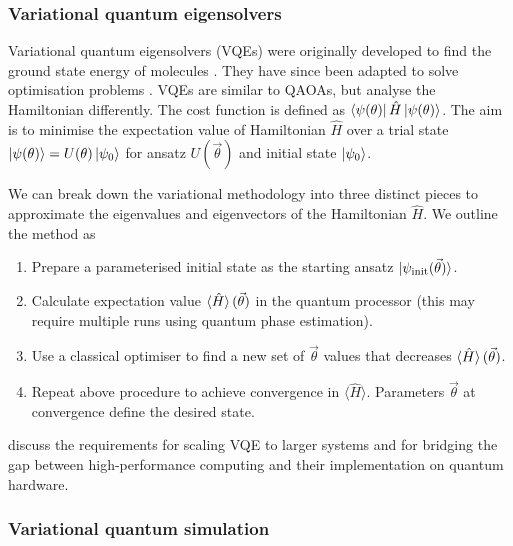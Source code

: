 \documentclass[10pt]{iopart}
\begin{document}
\subsubsection{Variational quantum eigensolvers}\label{sssec:VQE}\hfill

Variational quantum eigensolvers (VQEs) were originally developed to find the ground state energy of molecules \cite{McClean2016,Kandala2017}. They have since been adapted to solve optimisation problems \cite{Cerezo2021}. VQEs are similar to QAOAs, but analyse the Hamiltonian differently. The cost function is defined as $\bra{\psi(\theta)} \hat{H} \ket{\psi(\theta)}$. The aim is to minimise the expectation value of Hamiltonian $\hat{H}$ over a trial state $\ket{\psi(\theta)} = U(\theta) \ket{\psi_0}$ for ansatz $U(\vec{\theta})$ and initial state $\ket{\psi_0}$. 

We can break down the variational methodology into three distinct pieces to approximate the eigenvalues and eigenvectors of the Hamiltonian $\hat{H}$. We outline the method as
\begin{enumerate}
\item Prepare a parameterised initial state as the starting ansatz $\ket{\psi_\text{init}(\vec{\theta})}$.
\item Calculate expectation value $\braket{\hat{H}}(\vec{\theta})$ in the quantum processor (this may require multiple runs using quantum phase estimation).
\item Use a classical optimiser to find a new set of $\vec{\theta}$ values that decreases $\braket{\hat{H}}(\vec{\theta})$.
\item Repeat above procedure to achieve convergence in $\langle\hat{H}\rangle$. Parameters $\vec{\theta}$ at convergence define the desired state.
\end{enumerate}

\citeauthor{Kandala2017} \cite{Kandala2017} discuss the requirements for scaling VQE to larger systems and for bridging the gap between high-performance computing and their implementation on quantum hardware.


\subsubsection{Variational quantum simulation}\hfill
\end{document}
